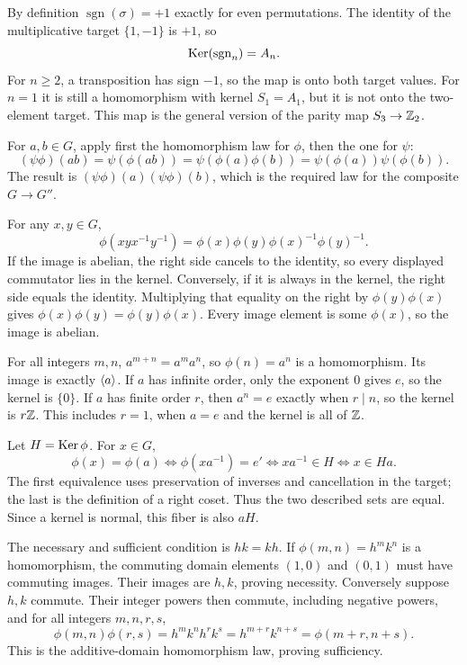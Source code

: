 By definition $\operatorname{sgn}(\sigma)=+1$ exactly for even permutations. The identity of the multiplicative target $\{1,-1\}$ is $+1$, so
\[\operatorname{Ker}(\operatorname{sgn}_n)=A_n.\]
For $n\ge2$, a transposition has sign $-1$, so the map is onto both target values. For $n=1$ it is still a homomorphism with kernel $S_1=A_1$, but it is not onto the two-element target. This map is the general version of the parity map $S_3\to\mathbb{Z}_2$.

For $a,b\in G$, apply first the homomorphism law for $\phi$, then the one for $\psi$:
\[(\psi\phi)(ab)=\psi(\phi(ab))=\psi(\phi(a)\phi(b))=\psi(\phi(a))\psi(\phi(b)).\]
The result is $(\psi\phi)(a)(\psi\phi)(b)$, which is the required law for the composite $G\to G''$.

For any $x,y\in G$,
\[\phi(xyx^{-1}y^{-1})=\phi(x)\phi(y)\phi(x)^{-1}\phi(y)^{-1}.\]
If the image is abelian, the right side cancels to the identity, so every displayed commutator lies in the kernel. Conversely, if it is always in the kernel, the right side equals the identity. Multiplying that equality on the right by $\phi(y)\phi(x)$ gives $\phi(x)\phi(y)=\phi(y)\phi(x)$. Every image element is some $\phi(x)$, so the image is abelian.

For all integers $m,n$, $a^{m+n}=a^ma^n$, so $\phi(n)=a^n$ is a homomorphism. Its image is exactly $\langle a\rangle$. If $a$ has infinite order, only the exponent $0$ gives $e$, so the kernel is $\{0\}$. If $a$ has finite order $r$, then $a^n=e$ exactly when $r\mid n$, so the kernel is $r\mathbb{Z}$. This includes $r=1$, when $a=e$ and the kernel is all of $\mathbb{Z}$.

Let $H=\operatorname{Ker}\phi$. For $x\in G$,
\[\phi(x)=\phi(a)\iff\phi(xa^{-1})=e'\iff xa^{-1}\in H\iff x\in Ha.\]
The first equivalence uses preservation of inverses and cancellation in the target; the last is the definition of a right coset. Thus the two described sets are equal. Since a kernel is normal, this fiber is also $aH$.

The necessary and sufficient condition is $hk=kh$.
If $\phi(m,n)=h^mk^n$ is a homomorphism, the commuting domain elements $(1,0)$ and $(0,1)$ must have commuting images. Their images are $h,k$, proving necessity.
Conversely suppose $h,k$ commute. Their integer powers then commute, including negative powers, and for all integers $m,n,r,s$,
\[\phi(m,n)\phi(r,s)=h^mk^nh^rk^s=h^{m+r}k^{n+s}=\phi(m+r,n+s).\]
This is the additive-domain homomorphism law, proving sufficiency.

